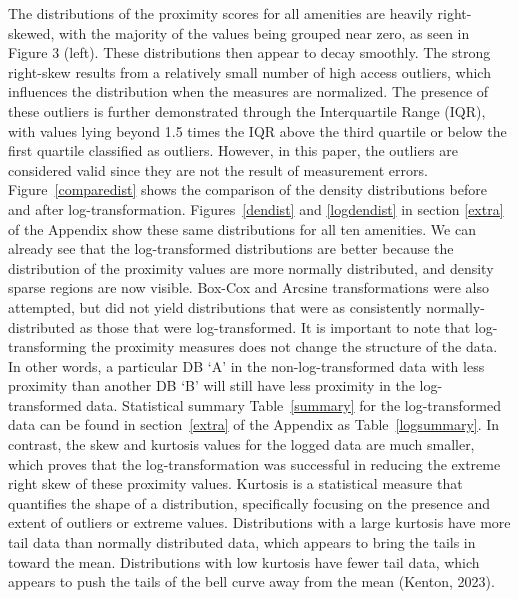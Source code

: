 \documentclass[11pt, a4paper]{article}
\begin{document}
The distributions of the proximity scores for all amenities are heavily right-skewed, with the majority of the values being grouped near zero, as seen in Figure 3 (left). These distributions then appear to decay smoothly. The strong right-skew results from a relatively small number of high access outliers, which influences the distribution when the measures are normalized. The presence of these outliers is further demonstrated through the Interquartile Range (IQR), with values lying beyond 1.5 times the IQR above the third quartile or below the first quartile classified as outliers. However, in this paper, the outliers are considered valid since they are not the result of measurement errors. Figure~\ref{comparedist} shows the comparison of the density distributions before and after log-transformation. Figures~\ref{dendist} and \ref{logdendist} in section \ref{extra} of the Appendix show these same distributions for all ten amenities. We can already see that the log-transformed distributions are better because the distribution of the proximity values are more normally distributed, and density sparse regions are now visible. Box-Cox and Arcsine transformations were also attempted, but did not yield distributions that were as consistently normally-distributed as those that were log-transformed. It is important to note that log-transforming the proximity measures does not change the structure of the data. In other words, a particular DB `A' in the non-log-transformed data with less proximity than another DB `B' will still have less proximity in the log-transformed data. Statistical summary Table~\ref{summary} for the log-transformed data can be found in section~\ref{extra} of the Appendix as Table~\ref{logsummary}. In contrast, the skew and kurtosis values for the logged data are much smaller, which proves that the log-transformation was successful in reducing the extreme right skew of these proximity values. Kurtosis is a statistical measure that quantifies the shape of a distribution, specifically focusing on the presence and extent of outliers or extreme values. Distributions with a large kurtosis have more tail data than normally distributed data, which appears to bring the tails in toward the mean. Distributions with low kurtosis have fewer tail data, which appears to push the tails of the bell curve away from the mean (Kenton, 2023).
\end{document}
